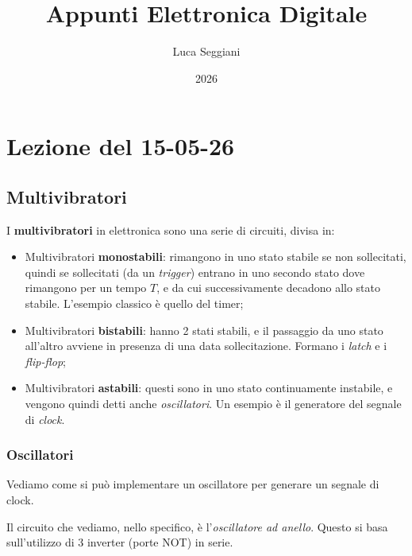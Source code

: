 \documentclass[a4paper,11pt]{article}
\title{Appunti Elettronica Digitale}
\author{Luca Seggiani}
\date{2026}
\begin{document}
\section{Lezione del 15-05-26}

\thispagestyle{empty}
\pagestyle{fancy}


\subsection{Multivibratori}
I \textbf{multivibratori} in elettronica sono una serie di circuiti, divisa in:
\begin{itemize}
	\item Multivibratori \textbf{monostabili}: rimangono in uno stato stabile se non sollecitati, quindi se sollecitati (da un \textit{trigger}) entrano in uno secondo stato dove rimangono per un tempo $T$, e da cui successivamente decadono allo stato stabile. L'esempio classico è quello del timer; 
	\item Multivibratori \textbf{bistabili}: hanno 2 stati stabili, e il passaggio da uno stato all'altro avviene in presenza di una data sollecitazione. Formano i \textit{latch} e i \textit{flip-flop}; 
	\item Multivibratori \textbf{astabili}: questi sono in uno stato continuamente instabile, e vengono quindi detti anche \textit{oscillatori}. Un esempio è il generatore del segnale di \textit{clock}.
\end{itemize}

\subsubsection{Oscillatori}
Vediamo come si può implementare un oscillatore per generare un segnale di clock. 

Il circuito che vediamo, nello specifico, è l'\textit{oscillatore ad anello}.
Questo si basa sull'utilizzo di 3 inverter (porte NOT) in serie.

\begin{center}
\end{center}
\end{document}
